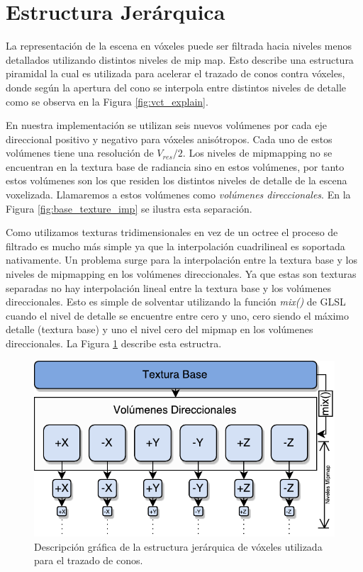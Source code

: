 \section{Estructura Jerárquica} %
\label{sec:estructura_jerarquica_impl}
La representación de la escena en vóxeles puede ser filtrada hacia niveles menos detallados utilizando distintos niveles de mip map. Esto describe una estructura piramidal la cual es utilizada para acelerar el trazado de conos contra vóxeles, donde según la apertura del cono se interpola entre distintos niveles de detalle como se observa en la Figura \ref{fig:vct_explain}.

En nuestra implementación se utilizan seis nuevos volúmenes por cada eje direccional positivo y negativo para vóxeles anisótropos. Cada uno de estos volúmenes tiene una resolución de $V_{res}/{2}$. Los niveles de mipmapping no se encuentran en la textura base de radiancia sino en estos volúmenes, por tanto estos volúmenes son los que residen los distintos niveles de detalle de la escena voxelizada. Llamaremos a estos volúmenes como \emph{volúmenes direccionales}. En la Figura \ref{fig:base_texture_imp} se ilustra esta separación.

Como utilizamos texturas tridimensionales en vez de un octree el proceso de filtrado es mucho más simple ya que la interpolación cuadrilineal es soportada nativamente. Un problema surge para la interpolación entre la textura base y los niveles de mipmapping en los volúmenes direccionales. Ya que estas son texturas separadas no hay interpolación lineal entre la textura base y los volúmenes direccionales. Esto es simple de solventar utilizando la función \emph{mix()} de GLSL cuando el nivel de detalle se encuentre entre cero y uno, cero siendo el máximo detalle (textura base) y uno el nivel cero del mipmap en los volúmenes direccionales. La Figura \ref{fig:hierarchy_impl} describe esta estructra.

\begin{figure}[H]
    \centering
    \includegraphics[width=.8\linewidth]{media/hierarchy.pdf}
    \caption{Descripción gráfica de la estructura jerárquica de vóxeles utilizada para el trazado de conos.}
    \label{fig:hierarchy_impl}
\end{figure}

